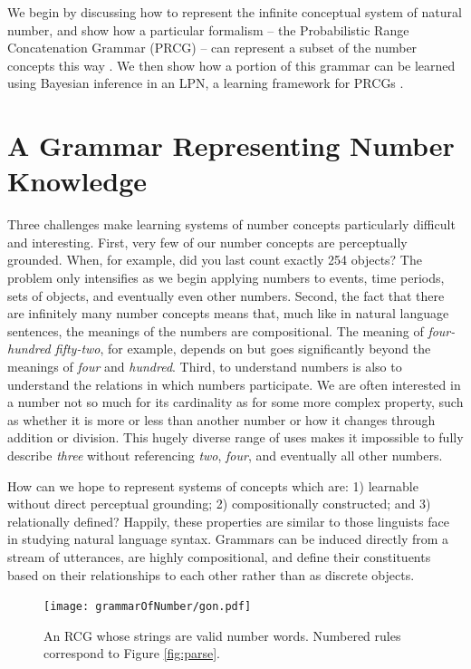 \documentclass[10pt,letterpaper]{article}
\begin{document}
We begin by discussing how to represent the infinite conceptual system
of natural number, and show how a particular formalism -- the
Probabilistic Range Concatenation Grammar (PRCG) -- can represent a
subset of the number concepts this way \citep{boullier2005range}. We
then show how a portion of this grammar can be learned using Bayesian
inference in an LPN, a learning framework for PRCGs
\citep{DecRulTen2015}.

\section{A Grammar Representing Number Knowledge}

Three challenges make learning systems of number concepts particularly
difficult and interesting. First, very few of our number concepts are
perceptually grounded. When, for example, did you last count exactly
254 objects? The problem only intensifies as we begin applying numbers
to events, time periods, sets of objects, and eventually even other
numbers. Second, the fact that there are infinitely many number
concepts means that, much like in natural language sentences, the
meanings of the numbers are compositional. The meaning of
\emph{four-hundred fifty-two}, for example, depends on but goes
significantly beyond the meanings of \emph{four} and \emph{hundred}.
Third, to understand numbers is also to understand the relations in
which numbers participate. We are often interested in a number not so
much for its cardinality as for some more complex property, such as
whether it is more or less than another number or how it changes
through addition or division. This hugely diverse range of uses makes
it impossible to fully describe \emph{three} without referencing
\emph{two}, \emph{four}, and eventually all other numbers.

How can we hope to represent systems of concepts which are: 1)
learnable without direct perceptual grounding; 2) compositionally
constructed; and 3) relationally defined? Happily, these properties
are similar to those linguists face in studying natural language
syntax. Grammars can be induced directly from a stream of utterances,
are highly compositional, and define their constituents based on their
relationships to each other rather than as discrete objects.

\begin{figure}[t]
  \begin{centering}
    \texttt{[image: grammarOfNumber/gon.pdf]}
    \caption{An RCG whose strings are valid number words. Numbered rules correspond to Figure \ref{fig:parse}.}
    \label{fig:gon}
  \end{centering}
\end{figure}
\end{document}
